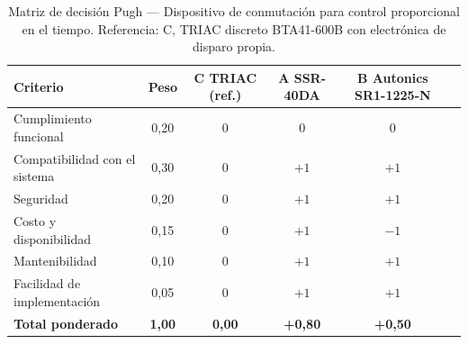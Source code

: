 \begin{table}[H]
\centering
\caption{Matriz de decisión Pugh --- Dispositivo de conmutación para control proporcional en el tiempo. Referencia: C, TRIAC discreto BTA41-600B con electrónica de disparo propia.}
\label{tab:pugh-ssr}
\begin{tabularx}{\textwidth}{Xccccc}
\toprule
\textbf{Criterio} & \textbf{Peso} & \textbf{C TRIAC (ref.)} & \textbf{A SSR-40DA} & \textbf{B Autonics SR1-1225-N} \\
\midrule
Cumplimiento funcional        & 0,20 & 0 & 0    & 0 \\
Compatibilidad con el sistema & 0,30 & 0 & $+1$ & $+1$ \\
Seguridad                     & 0,20 & 0 & $+1$ & $+1$ \\
Costo y disponibilidad        & 0,15 & 0 & $+1$ & $-1$ \\
Mantenibilidad                & 0,10 & 0 & $+1$ & $+1$ \\
Facilidad de implementación   & 0,05 & 0 & $+1$ & $+1$ \\
\midrule
\textbf{Total ponderado}      & \textbf{1,00} & \textbf{0,00} & \textbf{+0,80} & \textbf{+0,50} \\
\bottomrule
\end{tabularx}
\end{table}
